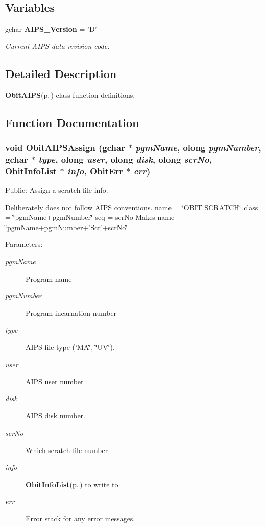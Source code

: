 \subsection*{Variables}
\begin{CompactItemize}
\item 
gchar {\bf AIPS\_\-Version} = 'D'
\begin{CompactList}\small\item\em Current AIPS data revision code. \item\end{CompactList}\end{CompactItemize}


\subsection{Detailed Description}
{\bf Obit\-AIPS}{\rm (p.\,\pageref{structObitAIPS})} class function definitions. 



\subsection{Function Documentation}
\subsubsection{\setlength{\rightskip}{0pt plus 5cm}void Obit\-AIPSAssign (gchar $\ast$ {\em pgm\-Name}, {\bf olong} {\em pgm\-Number}, gchar $\ast$ {\em type}, {\bf olong} {\em user}, {\bf olong} {\em disk}, {\bf olong} {\em scr\-No}, {\bf Obit\-Info\-List} $\ast$ {\em info}, {\bf Obit\-Err} $\ast$ {\em err})}\label{ObitAIPS_8c_a17}


Public: Assign a scratch file info. 

Deliberately does not follow AIPS conventions. name = \char`\"{}OBIT SCRATCH\char`\"{} class = \char`\"{}pgm\-Name+pgm\-Number\char`\"{} seq = scr\-No Makes name \char`\"{}pgm\-Name+pgm\-Number+'Scr'+scr\-No\char`\"{} \begin{Desc}
\item[Parameters:]
\begin{description}
\item[{\em pgm\-Name}]Program name \item[{\em pgm\-Number}]Program incarnation number \item[{\em type}]AIPS file type (\char`\"{}MA\char`\"{}, \char`\"{}UV\char`\"{}). \item[{\em user}]AIPS user number \item[{\em disk}]AIPS disk number. \item[{\em scr\-No}]Which scratch file number \item[{\em info}]{\bf Obit\-Info\-List}{\rm (p.\,\pageref{structObitInfoList})} to write to \item[{\em err}]Error stack for any error messages. \end{description}
\end{Desc}
